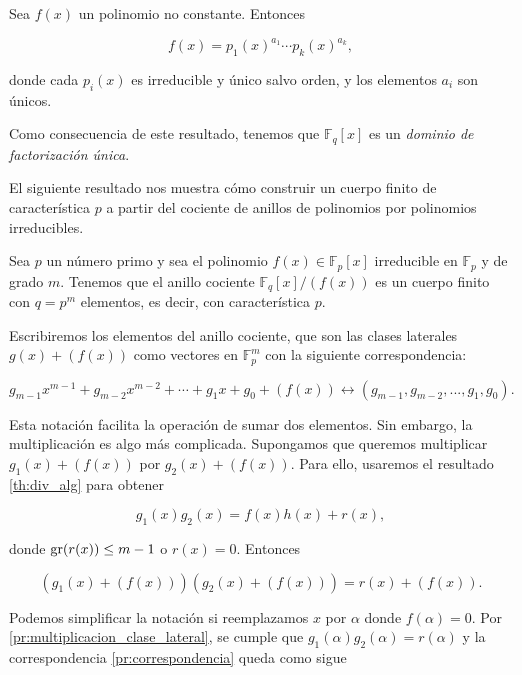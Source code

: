 \begin{theorem}
    Sea $f(x)$ un polinomio no constante. Entonces

    $$f(x) = p_1(x)^{a_1} \cdots p_k(x)^{a_k},$$

    donde cada $p_i(x)$ es irreducible y único salvo orden, y los elementos $a_i$ son únicos.
\end{theorem}

Como consecuencia de este resultado, tenemos que $\mathbb{F}_q[x]$ es un \emph{dominio de factorización única}.

El siguiente resultado nos muestra cómo construir un cuerpo finito de característica $p$ a partir del cociente de anillos de polinomios por polinomios irreducibles.

\begin{proposition}
    Sea $p$ un número primo y sea el polinomio $f(x) \in \mathbb{F}_p[x]$ irreducible en $\mathbb{F}_p$ y de grado $m$. Tenemos que el anillo cociente $\mathbb{F}_q[x]/\left(f(x)\right)$ es un cuerpo finito con $q = p^m$ elementos, es decir, con característica $p$.
\end{proposition}

Escribiremos los elementos del anillo cociente, que son las clases laterales $g(x) + (f(x))$ como vectores en $\mathbb{F}_p^m$ con la siguiente correspondencia:

\begin{equation}
    \label{pr:correspondencia}
    g_{m-1} x^{m-1} + g_{m-2} x^{m-2} + \cdots + g_{1} x + g_0 + (f(x)) \leftrightarrow (g_{m-1}, g_{m-2}, ..., g_1, g_0).
\end{equation}

Esta notación facilita la operación de sumar dos elementos. Sin embargo, la multiplicación es algo más complicada. Supongamos que queremos multiplicar $g_1(x) + (f(x))$ por $g_2(x) + (f(x))$. Para ello, usaremos el resultado \ref{th:div_alg} para obtener

\begin{equation}
    \label{pr:multiplicacion_clase_lateral}
    g_1(x) g_2(x) = f(x) h(x) + r(x),
\end{equation}

donde $\operatorname{gr}(r(x)) \leq m - 1$ o $r(x) = 0$. Entonces 

$$(g_1(x) + (f(x))) (g_2(x) + (f(x))) = r(x) + (f(x)).$$

Podemos simplificar la notación si reemplazamos $x$ por $\alpha$ donde $f(\alpha) = 0$. Por \ref{pr:multiplicacion_clase_lateral}, se cumple que $g_1(\alpha) g_2(\alpha) = r(\alpha)$ y la correspondencia \ref{pr:correspondencia} queda como sigue

